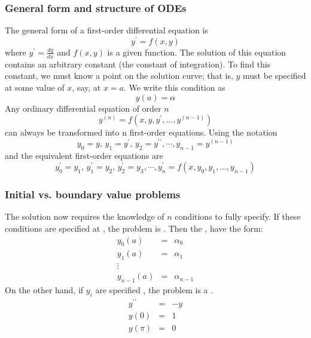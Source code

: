 \documentclass[hyperref={colorlinks=true}]{beamer}
\begin{document}
\begin{frame}%
  \frametitle{General form and structure of ODEs}

  The general form of a first-order differential equation is
  \begin{equation}
    y^{\prime} = f(x,y)
  \end{equation}
  where $y^{\prime} = \frac{dy}{dx}$ and $f(x, y)$ is a given function. The solution of this equation contains an arbitrary constant (the constant of integration). To find this constant, we must know a point on the solution curve; that is, $y$ must be specified at some value of $x$, say, at $x = a$. We write this condition as
  \begin{equation}
    y(a) = \alpha
  \end{equation}
  Any ordinary differential equation of order $n$
  \begin{equation}
    y^{(n)} = f(x,y,y^{\prime},...,y^{(n-1)})
  \end{equation}
  can always be transformed into n first-order equations. Using the notation
  \begin{equation}
    y_0 =y, \, y_1 =y^{\prime}, \, y_2 =y^{\prime\prime}, \cdots, y_{n-1} =y^{(n-1)}
  \end{equation}
  and the equivalent first-order equations are
  \begin{equation}
    y_0^{\prime} =y_1, \, y_1^{\prime} =y_2, \, y_2^{\prime} =y_3,\cdots, y_n^{\prime} =f(x,y_0,y_1,...,y_{n-1})
  \end{equation}

\end{frame}


\begin{frame}%
  \frametitle{Initial vs. boundary value problems}

  The solution now requires the knowledge of $n$ conditions to fully specify. If these conditions are specified at , the problem is . Then the , have the form:
  \begin{eqnarray}
    y_0(a) &=& \alpha_0 \nonumber\\
    y_1(a) &=& \alpha_1 \nonumber\\
    \vdots \nonumber \\
    y_{n-1}(a) &=& \alpha_{n-1} \nonumber
  \end{eqnarray}
  On the other hand, if $y_i$ are specified \alertbf, the problem is a .
  \begin{eqnarray}
    y^{\prime\prime} &=& -y \nonumber\\
    y(0)   &=& 1 \nonumber\\
    y(\pi) &=& 0 \nonumber
  \end{eqnarray}

\end{frame}
\end{document}
